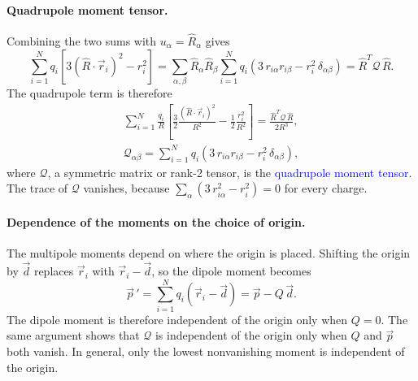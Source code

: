 \paragraph{Quadrupole moment tensor.}
Combining the two sums with $u_\alpha = \hat R_\alpha$ gives
\begin{equation*}
    \sum_{i=1}^{N} q_i\left[3(\hat R\cdot\vec r_i)^2 - r_i^2\right]
    = \sum_{\alpha,\beta}\hat R_\alpha\hat R_\beta \sum_{i=1}^{N} q_i\left(3\,r_{i\alpha}r_{i\beta} - r_i^2\,\delta_{\alpha\beta}\right)
    = \hat R^{T}\mathcal{Q}\,\hat R.
\end{equation*}
The quadrupole term is therefore
\begin{equation}
    \boxed{
    \begin{gathered}
    \sum_{i=1}^{N}\frac{q_i}{R}\left[\frac{3}{2}\frac{(\hat R\cdot\vec r_i)^2}{R^2} - \frac{1}{2}\frac{r_i^2}{R^2}\right]
    = \frac{\hat R^{T}\mathcal{Q}\,\hat R}{2R^3},\\[4pt]
    \mathcal{Q}_{\alpha\beta} = \sum_{i=1}^{N} q_i\left(3\,r_{i\alpha}r_{i\beta} - r_i^2\,\delta_{\alpha\beta}\right),
    \end{gathered}
    }
\end{equation}
where $\mathcal{Q}$, a symmetric matrix or rank-2 tensor, is the \textcolor{blue}{quadrupole moment tensor}. The trace of $\mathcal{Q}$ vanishes, because $\sum_\alpha\left(3\,r_{i\alpha}^2 - r_i^2\right) = 0$ for every charge.

\paragraph{Dependence of the moments on the choice of origin.}
The multipole moments depend on where the origin is placed. Shifting the origin by $\vec d$ replaces $\vec r_i$ with $\vec r_i - \vec d$, so the dipole moment becomes
\begin{equation*}
    \vec p\,' = \sum_{i=1}^{N} q_i\left(\vec r_i - \vec d\right) = \vec p - Q\,\vec d.
\end{equation*}
The dipole moment is therefore independent of the origin only when $Q = 0$. The same argument shows that $\mathcal{Q}$ is independent of the origin only when $Q$ and $\vec p$ both vanish. In general, only the lowest nonvanishing moment is independent of the origin.